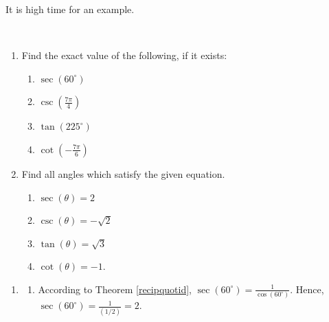 \documentclass{ximera}
\begin{document}



It is high time for an example.


\begin{example} \label{circularfunctionsex}  $~$

\begin{enumerate}

\item  Find the exact value of the following, if it exists:

\begin{enumerate}

\item  $\sec\left(60^{\circ}\right)$

\item  $\csc\left(\frac{7 \pi}{4} \right)$

\item  $\tan(225^{\circ})$

\item  $\cot\left(-\frac{7 \pi}{6} \right)$

\end{enumerate}

\item Find all angles which satisfy the given equation.   

\begin{enumerate}

\item  $\sec(\theta) =2$

\item  $\csc(\theta) = -\sqrt{2}$

\item  $\tan(\theta) = \sqrt{3}$

\item  \label{cotangentisnegativeone} $\cot(\theta) = -1$.

\end{enumerate}

\end{enumerate}

\begin{explanation}

\begin{enumerate}

\item \begin{enumerate}

\item  According to Theorem \ref{recipquotid},   $\sec\left(60^{\circ}\right) = \frac{1}{\cos\left(60^{\circ}\right)}$. Hence,  $\sec\left(60^{\circ}\right) = \frac{1}{(1/2)} = 2$.


\end{enumerate}
\end{enumerate}
\end{explanation}
\end{example}
\end{document}
